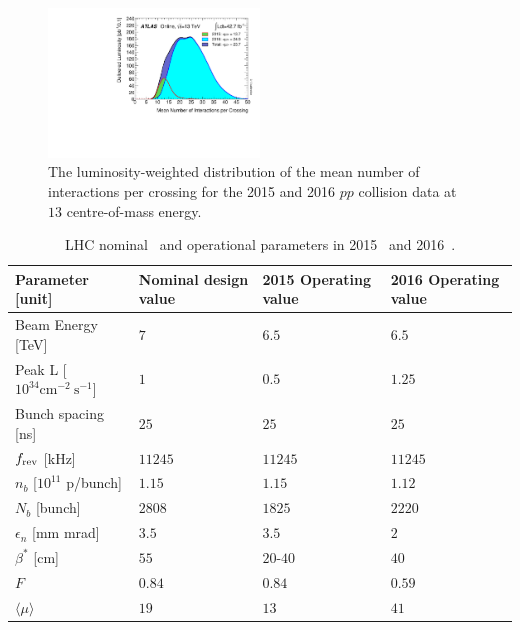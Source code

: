 \begin{figure}[h!]
  \centering
  \captionsetup{justification=centering}
  \includegraphics[width=0.5\textwidth,angle=-90]{figures/detector/Mu_2015_2016}
   \caption{The luminosity-weighted distribution of the mean number of interactions per crossing for the 2015 and 2016 $pp$ collision data at $13$ \TeV centre-of-mass energy.~\cite{Lumi_Run2}}
  \label{fig:Mu_2015_2016}
\end{figure}
\begin{table}[]
\centering
\begin{tabular*}{\textwidth}{@{\extracolsep{\fill}}llll}
\hline
Parameter [unit]   & Nominal design value & 2015 Operating value  & 2016 Operating value\\
\hline\hline
Beam Energy [TeV]  & $7$  & $6.5$  & $6.5$  \\
Peak L [$10^{34} \text{cm}^{−2}~\text{s}^{-1}$]   & $1$ &   $0.5$  & $1.25$           \\
Bunch spacing [ns]             &      $25$  &  $25$ &      $25$ \\
$f_{\rm rev}$ [kHz]    &     $11245$  & $11245$  & $11245$ \\
$n_b$  [$10^{11}$ p/bunch]   & $1.15$ &  $1.15$ & $1.12$\\
$N_b$  [bunch]         & $2808$   &      $1825$ &      $2220$\\
$\epsilon_n$  [mm mrad]        & $3.5$ &  $3.5$  & $2$\\
$\beta^*$   [cm]         & $55$  &   $20$-$40$  & $40$\\
$F$        &      $0.84$  & $0.84$  &  $0.59$ \\
$\langle \mu \rangle$ & $19$ & $13$ & $41$ \\ \hline
\hline            
\end{tabular*}
\caption[LHC nominal and operational parameters]{LHC nominal~\cite{LHCPaper} and operational parameters in 2015~\cite{LHC_2015} and 2016~\cite{LHC_2016}.}
\label{Ch2:tab-lhc}
\end{table}


